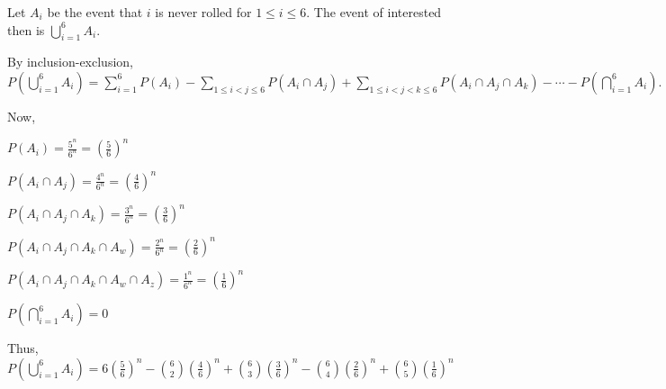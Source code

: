 Let $A_{i}$ be the event that $i$ is never rolled for $1 \leq i \leq 6$.
The event of interested then is $\bigcup\limits_{i=1}^{6}A_{i}.$

By inclusion-exclusion, 
$P(\bigcup\limits_{i=1}^{6}A_{i}) = \sum_{i=1}^{6}P(A_{i}) - 
\sum_{1 \leq i < j \leq 6}P(A_{i} \cap A_{j}) + 
\sum_{1 \leq i < j < k \leq 6}P(A_{i} \cap A_{j} \cap A_{k}) - 
\cdots - P(\bigcap\limits_{i=1}^{6}A_{i}).$

Now,


$P(A_{i}) = \frac{5^{n}}{6^{n}} = (\frac{5}{6})^{n}$

$P(A_{i} \cap A_{j}) = \frac{4^{n}}{6^{n}} = (\frac{4}{6})^{n}$

$P(A_{i} \cap A_{j} \cap A_{k}) = \frac{3^{n}}{6^{n}} = (\frac{3}{6})^{n}$

$P(A_{i} \cap A_{j} \cap A_{k} \cap A_{w}) = \frac{2^{n}}{6^{n}} = 
(\frac{2}{6})^{n}$

$P(A_{i} \cap A_{j} \cap A_{k} \cap A_{w} \cap A_{z}) = \frac{1^{n}}{6^{n}} = 
(\frac{1}{6})^{n}$

$P(\bigcap\limits_{i=1}^{6}A_{i}) = 0$

Thus, 
$P(\bigcup\limits_{i=1}^{6}A_{i}) = 6(\frac{5}{6})^{n} - 
\binom{6}{2}(\frac{4}{6})^{n} + \binom{6}{3}(\frac{3}{6})^{n} - 
\binom{6}{4}(\frac{2}{6})^{n} + \binom{6}{5}(\frac{1}{6})^{n}$